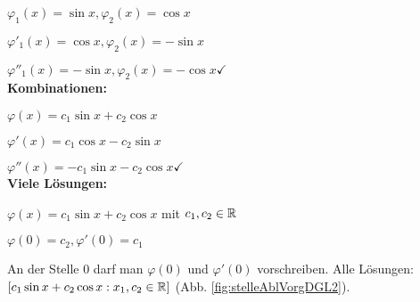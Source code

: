$\varphi_1(x) = \sin x, \varphi_2(x) = \cos x$

$\varphi'_1(x) = \cos x, \varphi_2(x) = - \sin x$

$\varphi''_1(x) = -\sin x, \varphi_2(x) = - \cos x \checkmark$\\

\textbf{Kombinationen:}

$\varphi(x) = c_1 \sin x + c_2 \cos x$

$\varphi'(x) = c_1 \cos x - c_2 \sin x$

$\varphi''(x) = - c_1 \sin x - c_2 \cos x \checkmark$\\

\textbf{Viele Lösungen:}

$\varphi(x) = c_1 \sin x + c_2 \cos x$ mit $c_1, c_2 \in \mathbb{R}$

$\varphi(0) = c_2, \varphi'(0) = c_1$

An der Stelle 0 darf man $\varphi(0)$ und $\varphi'(0)$ vorschreiben. 
Alle Lösungen: $ \left[ c_1 \sin x + c_2 \cos x : x_1, c_2 \in \mathbb{R} \right] $ (Abb. \ref{fig:stelleAblVorgDGL2}).